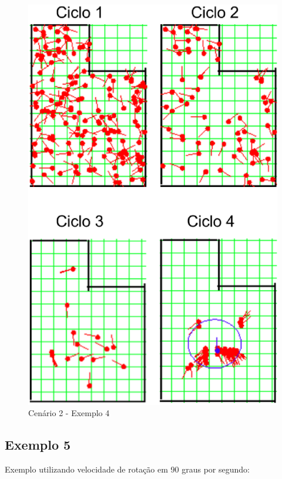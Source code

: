 \begin{figure}[H]
  \centering
  \includegraphics[scale=0.4]{figuras/cen2_ex4.eps}
  \caption[Cenário 2 - Exemplo 4]{Cenário 2 - Exemplo 4}
  \label{img:cen2_ex4}
\end{figure}

\subsection{Exemplo 5}

Exemplo utilizando velocidade de rotação em 90 graus por segundo:

